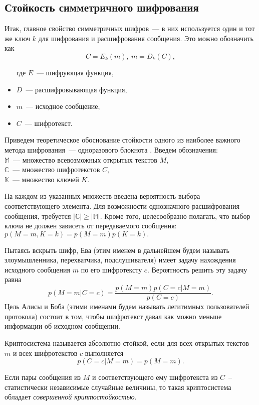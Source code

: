 \subsection{Стойкость симметричного шифрования}
Итак, главное свойство симметричных шифров~--- в них используется один и тот же ключ $k$ для шифрования и расшифрования сообщения.
Это можно обозначить как $$ C = E_k(m),\ m = D_k(C), $$
\begin{itemize}
  \item[где] $E$~--- шифрующая функция,
  \item $D$~--- расшифровывающая функция,
  \item $m$~--- исходное сообщение,
  \item $C$~--- шифротекст.
\end{itemize}

Приведем теоретическое обоснование стойкости одного из наиболее важного метода шифрования~--- одноразового блокнота \cite{vernam_cryptosystem}.
Введем обозначения: \\
$ \mathbb{M}$~--- множество всевозможных открытых текстов $M$, \\
$ \mathbb{C}$~--- множество шифротекстов $C$, \\
$ \mathbb{K}$~--- множество ключей $K$.

На каждом из указанных множеств введена вероятность выбора соответствующего элемента.
Для возможности однозначного расшифрования сообщения, требуется $|\mathbb{C}| \ge |\mathbb{M}|.$
Кроме того, целесообразно полагать, что выбор ключа не должен зависеть от передаваемого сообщения: $p(M = m, K = k) = p(M = m) p(K = k).$

Пытаясь вскрыть шифр, Ева (этим именем в дальнейшем будем называть злоумышленника, перехватчика, подслушивателя) имеет задачу нахождения исходного сообщения $m$ по его шифротексту $c$. Вероятность решить эту задачу равна
$$ p(M = m | C = c) = \frac{p(M = m) p(C = c|M = m)}{p(C = c)}. $$
Цель Алисы и Боба (этими именами будем называть легитимных пользователей протокола) состоит в том, чтобы шифротекст давал как можно меньше информации об исходном сообщении.

\begin{definition}
  Криптосистема называется абсолютно стойкой, если для всех открытых текстов $m$ и всех шифротекстов $c$ выполняется
$$ p(C = c|M = m) = p(M = m). $$
\end{definition}
\begin{definition}
Если пары сообщения из $M$ и соответствующего ему шифротекста из $C$~-- статистически независимые случайные величины, 
то такая криптосистема обладает \textit{совершенной криптостойкостью}.   
\end{definition}

